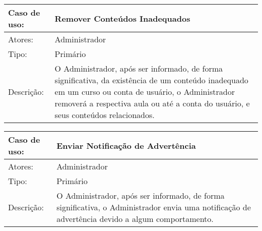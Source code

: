\documentclass[12pt,a4paper,onecolumn,titlepage]{article}
\begin{document}
\begin{table}[h!]
\begin{center}
\begin{tabular}{p{2.5cm} p{9.5cm}}
Caso de uso: & \textbf{Remover Conteúdos Inadequados} \\ \hline
Atores: & Administrador \\ \hline
Tipo: & Primário \\ \hline
Descrição: & O Administrador, após ser informado, de forma significativa, da existência de um conteúdo inadequado em um curso ou conta de usuário, o Administrador removerá a respectiva aula ou até a conta do usuário, e seus conteúdos relacionados.

\end{tabular}
\end{center}
\end{table}

\begin{table}[h!]
\begin{center}
\begin{tabular}{p{2.5cm} p{9.5cm}}
Caso de uso: & \textbf{Enviar Notificação de Advertência} \\ \hline
Atores: & Administrador \\ \hline
Tipo: & Primário \\ \hline
Descrição: & O Administrador, após ser informado, de forma significativa, o Administrador envia uma notificação de advertência devido a algum comportamento.

\end{tabular}
\end{center}
\end{table}
\end{document}
